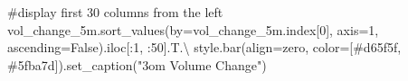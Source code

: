 \documentclass[
  letterpaper,
  DIV=11,
  numbers=noendperiod]{scrartcl}
\newenvironment{Shaded}{\begin{snugshade}}{\end{snugshade}}
\newcommand{\CommentTok}[1]{\textcolor[rgb]{0.37,0.37,0.37}{#1}}
\newcommand{\DecValTok}[1]{\textcolor[rgb]{0.68,0.00,0.00}{#1}}
\newcommand{\NormalTok}[1]{\textcolor[rgb]{0.00,0.23,0.31}{#1}}
\newcommand{\OperatorTok}[1]{\textcolor[rgb]{0.37,0.37,0.37}{#1}}
\newcommand{\StringTok}[1]{\textcolor[rgb]{0.13,0.47,0.30}{#1}}
\newcommand{\VariableTok}[1]{\textcolor[rgb]{0.07,0.07,0.07}{#1}}
\begin{document}
\begin{Shaded}
\begin{Highlighting}[]
\CommentTok{\#display first 30 columns from the left}
\NormalTok{vol\_change\_5m.sort\_values(by}\OperatorTok{=}\NormalTok{vol\_change\_5m.index[}\DecValTok{0}\NormalTok{], axis}\OperatorTok{=}\DecValTok{1}\NormalTok{, ascending}\OperatorTok{=}\VariableTok{False}\NormalTok{).iloc[:}\DecValTok{1}\NormalTok{, :}\DecValTok{50}\NormalTok{].T.}\OperatorTok{\textbackslash{}}
\NormalTok{    style.bar(align}\OperatorTok{=}\StringTok{\textquotesingle{}zero\textquotesingle{}}\NormalTok{, color}\OperatorTok{=}\NormalTok{[}\StringTok{\textquotesingle{}\#d65f5f\textquotesingle{}}\NormalTok{, }\StringTok{\textquotesingle{}\#5fba7d\textquotesingle{}}\NormalTok{]).set\_caption(}\StringTok{"3om Volume Change"}\NormalTok{)}
\end{Highlighting}
\end{Shaded}
\end{document}
